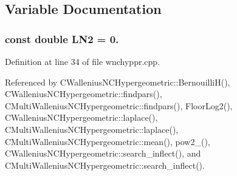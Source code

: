 \subsection{Variable Documentation}
\subsubsection[{L\-N2}]{\setlength{\rightskip}{0pt plus 5cm}const double L\-N2 = 0.\hspace{0.3cm}{\ttfamily [static]}}\label{rnd_2wnchyppr_8cpp_aa4ae7c64775070011fae8d5610ae1a12}


Definition at line 34 of file wnchyppr.\-cpp.



Referenced by C\-Wallenius\-N\-C\-Hypergeometric\-::\-Bernouilli\-H(), C\-Wallenius\-N\-C\-Hypergeometric\-::findpars(), C\-Multi\-Wallenius\-N\-C\-Hypergeometric\-::findpars(), Floor\-Log2(), C\-Wallenius\-N\-C\-Hypergeometric\-::laplace(), C\-Multi\-Wallenius\-N\-C\-Hypergeometric\-::laplace(), C\-Multi\-Wallenius\-N\-C\-Hypergeometric\-::mean(), pow2\-\_(), C\-Wallenius\-N\-C\-Hypergeometric\-::search\-\_\-inflect(), and C\-Multi\-Wallenius\-N\-C\-Hypergeometric\-::search\-\_\-inflect().

